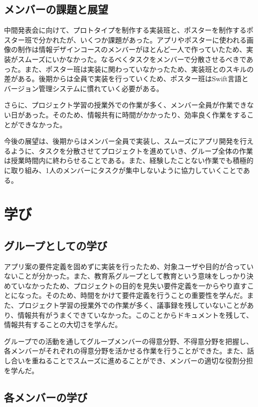 \documentclass[openany,11pt,papersize]{jsbook}
\begin{document}
\section{メンバーの課題と展望}
中間発表会に向けて、プロトタイプを制作する実装班と、ポスターを制作するポスター班で分かれたが、いくつか課題があった。アプリやポスターに使われる画像の制作は情報デザインコースのメンバーがほとんど一人で作っていたため、実装がスムーズにいかなかった。なるべくタスクをメンバーで分散させるべきであった。また、ポスター班は実装に関わっていなかったため、実装班とのスキルの差がある。後期からは全員で実装を行っていくため、ポスター班はSwift言語とバージョン管理システムに慣れていく必要がある。
\par
さらに、プロジェクト学習の授業外での作業が多く、メンバー全員が作業できない日があった。そのため、情報共有に時間がかかったり、効率良く作業をすることができなかった。
\par
今後の展望は、後期からはメンバー全員で実装し、スムーズにアプリ開発を行えるように、タスクを分散させてプロジェクトを進めていき、グループ全体の作業は授業時間内に終わらせることである。また、経験したことない作業でも積極的に取り組み、1人のメンバーにタスクが集中しないように協力していくことである。




\chapter{学び}
\section{グループとしての学び}
アプリ案の要件定義を固めずに実装を行ったため、対象ユーザや目的が合っていないことが分かった。また、教育系グループとして教育という意味をしっかり決めていなかったため、プロジェクトの目的を見失い要件定義を一からやり直すことになった。そのため、時間をかけて要件定義を行うことの重要性を学んだ。また、プロジェクト学習の授業外での作業が多く、議事録を残していないことがあり、情報共有がうまくできていなかった。このことからドキュメントを残して、情報共有することの大切さを学んだ。
\par
グループでの活動を通してグループメンバーの得意分野、不得意分野を把握し、各メンバーがそれぞれの得意分野を活かせる作業を行うことができた。また、話し合いを重ねることでスムーズに進めることができ、メンバーの適切な役割分担を学んだ。

\section{各メンバーの学び}
\end{document}
